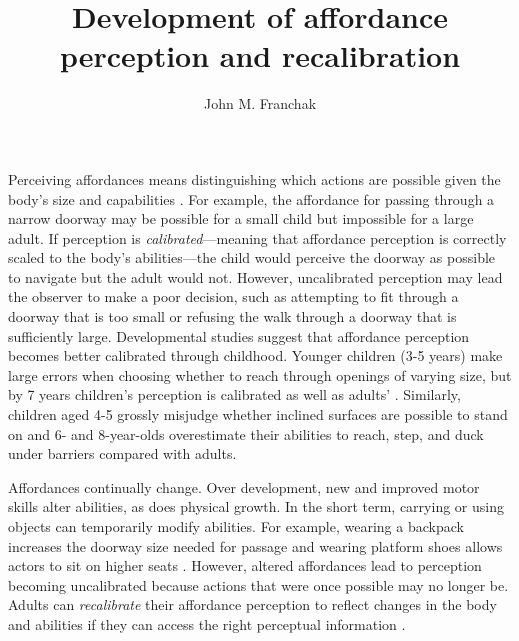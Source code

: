 \documentclass[a4paper,man,natbib,floatsintext,noextraspace]{apa6}
\title{Development of affordance perception and recalibration}
\author{John M. Franchak}
\affiliation{University of California, Riverside}
\begin{document}
\maketitle

Perceiving affordances means distinguishing which actions are possible given the body's size and capabilities \citep{Gibson79}. For example, the affordance for passing through a narrow doorway may be possible for a small child but impossible for a large adult. If perception is \textit{calibrated}---meaning that affordance perception is correctly scaled to the body's abilities---the child would perceive the doorway as possible to navigate but the adult would not. However, uncalibrated perception may lead the observer to make a poor decision, such as attempting to fit through a doorway that is too small or refusing the walk through a doorway that is sufficiently large. Developmental studies suggest that affordance perception becomes better calibrated through childhood. Younger children (3-5 years) make large errors when choosing whether to reach through openings of varying size, but by 7 years children’s perception is calibrated as well as adults' \citep{ChildReaching}. Similarly, children aged 4-5 grossly misjudge whether inclined surfaces are possible to stand on \citep{KlevbergAnderson} and 6- and 8-year-olds overestimate their abilities to reach, step, and duck under barriers \citep{Plumert95} compared with adults.

Affordances continually change. Over development, new and improved motor skills alter abilities, as does physical growth. In the short term, carrying or using objects can temporarily modify abilities. For example, wearing a backpack increases the doorway size needed for passage  and wearing platform shoes allows actors to sit on higher seats \citep{Mark87}. However, altered affordances lead to perception becoming uncalibrated because actions that were once possible may no longer be. Adults can \textit{recalibrate} their affordance perception to reflect changes in the body and abilities if they can access the right perceptual information \citep{Recal,DoorwayLearning,Mark87,MarkSitting90}. 
\end{document}
